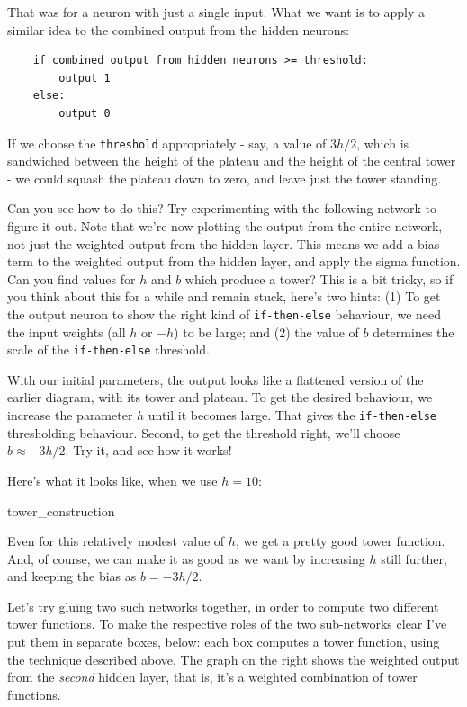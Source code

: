 That was for a neuron with just a single input. What we want is to apply a similar idea to the combined output from the hidden neurons:



\begin{lstlisting}
    if combined output from hidden neurons >= threshold:
        output 1
    else:
        output 0

\end{lstlisting}


If we choose the \texttt{threshold} appropriately - say, a value of $3h/2$, which is sandwiched between the height of the plateau and the height of the central tower - we could squash the plateau down to zero, and leave just the tower standing.


Can you see how to do this? Try experimenting with the following network to figure it out. Note that we're now plotting the output from the entire network, not just the weighted output from the hidden layer. This means we add a bias term to the weighted output from the hidden layer, and apply the sigma function. Can you find values for $h$ and $b$ which produce a tower? This is a bit tricky, so if you think about this for a while and remain stuck, here's two hints: (1) To get the output neuron to show the right kind of \texttt{if-then-else} behaviour, we need the input weights (all $h$ or $-h$) to be large; and (2) the value of $b$ determines the scale of the \texttt{if-then-else} threshold.


With our initial parameters, the output looks like a flattened version of the earlier diagram, with its tower and plateau. To get the desired behaviour, we increase the parameter $h$ until it becomes large. That gives the \texttt{if-then-else} thresholding behaviour. Second, to get the threshold right, we'll choose $b \approx -3h/2$. Try it, and see how it works!


Here's what it looks like, when we use $h = 10$:

\begin{movieNote}{tower\_\allowbreak{}construction}
\end{movieNote}

\noindent Even for this relatively modest value of $h$, we get a pretty good tower function. And, of course, we can make it as good as we want by increasing $h$ still further, and keeping the bias as $b = -3h/2$.


Let's try gluing two such networks together, in order to compute two different tower functions. To make the respective roles of the two sub-networks clear I've put them in separate boxes, below: each box computes a tower function, using the technique described above. The graph on the right shows the weighted output from the \emph{second} hidden layer, that is, it's a weighted combination of tower functions.


